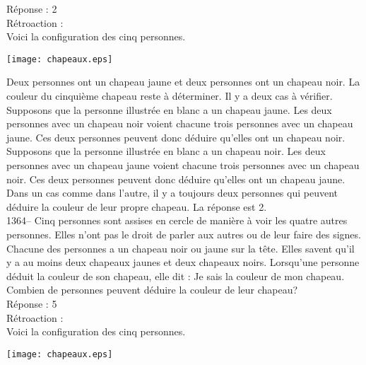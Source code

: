 ﻿\documentclass[letterpaper, 12pt]{article}
\begin{document}
R\'eponse : 2\\

R\'etroaction : \\
Voici la configuration des cinq personnes.
    \begin{center}
    \texttt{[image: chapeaux.eps]}
    \end{center}

Deux personnes ont un chapeau jaune et deux personnes ont un chapeau noir.
La couleur du cinqui\`eme chapeau reste \`a d\'eterminer.  Il y a deux cas
\`a v\'erifier.\\

Supposons que la personne illustr\'ee en blanc a un chapeau jaune.  Les deux
personnes avec un chapeau noir voient chacune trois personnes avec un
chapeau jaune.  Ces deux personnes peuvent donc d\'eduire qu'elles ont un
chapeau noir.  \\
Supposons que la personne illustr\'ee en blanc a un chapeau noir.  Les deux
personnes avec un chapeau jaune voient chacune trois personnes avec un
chapeau noir.  Ces deux personnes peuvent donc d\'eduire qu'elles ont un
chapeau jaune.  \\
Dans un cas comme dans l'autre, il y a toujours deux personnes qui peuvent
d\'eduire la couleur de leur propre chapeau.  La r\'eponse est 2.\\

1364-- Cinq personnes sont assises en cercle de mani\`ere \`a voir
les quatre autres personnes.  Elles n'ont pas le droit de parler aux
autres ou de leur faire des signes.  Chacune des personnes a un
chapeau noir ou jaune sur la t\^ete.  Elles savent qu'il y a au
moins deux chapeaux jaunes et deux chapeaux noirs.  Lorsqu'une
personne d\'eduit la couleur de son chapeau, elle dit : \og Je sais
la couleur de mon chapeau\fg .  Combien de personnes
peuvent d\'eduire la couleur de leur chapeau?\\

R\'eponse : 5\\

R\'etroaction : \\
Voici la configuration des cinq personnes.
    \begin{center}
    \texttt{[image: chapeaux.eps]}
    \end{center}
\end{document}
